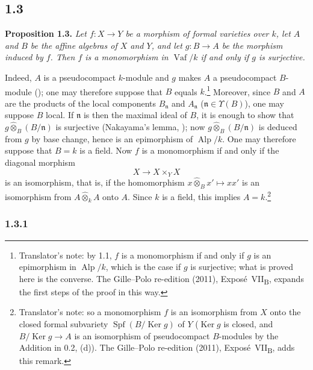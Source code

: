 
\subsection*{1.3}
\label{sga3:VIIB:1.3}

\noindent\textbf{Proposition 1.3.}
\label{sga3:VIIB:1.3.prop}
{\itshape Let \(f:X\to Y\) be a morphism of formal varieties over
\(k\), let \(A\) and \(B\) be the affine algebras of \(X\) and \(Y\),
and let \(g:B\to A\) be the morphism induced by \(f\). Then \(f\) is a
monomorphism in \(\operatorname{Vaf}/k\) if and only if \(g\) is
surjective.}

Indeed, \(A\) is a pseudocompact \(k\)-module and \(g\) makes \(A\) a
pseudocompact \(B\)-module (); one may therefore suppose that
\(B\) equals \(k\).\footnote{Translator's note: by 1.1, \(f\) is a monomorphism if and only if \(g\) is an
epimorphism in \(\operatorname{Alp}/k\), which is the case if \(g\) is surjective; what is proved here is
the converse. The Gille--Polo re-edition (2011), Expos\'e~VII\textsubscript{B}, expands the first steps of
the proof in this way.} Moreover, since \(B\) and \(A\) are the products of
the local components \(B_{\mathfrak n}\) and \(A_{\mathfrak n}\)
(\(\mathfrak n\in\Upsilon(B)\)), one may suppose \(B\) local. If
\(\mathfrak n\) is then the maximal ideal of \(B\), it is enough to show
that \(g\widehat{\otimes}_B(B/\mathfrak n)\) is surjective (Nakayama's
lemma, ); now \(g\widehat{\otimes}_B(B/\mathfrak n)\) is deduced
from \(g\) by base change, hence is an epimorphism of
\(\operatorname{Alp}/k\). One may therefore suppose that \(B=k\) is a
field. Now \(f\) is a monomorphism if and only if the diagonal morphism
\[
  X\longrightarrow X\times_YX
\]
is an isomorphism, that is, if the homomorphism
\(x\widehat{\otimes}_Bx'\mapsto xx'\) is an isomorphism from
\(A\widehat{\otimes}_kA\) onto \(A\). Since \(k\) is a field, this implies
\(A=k\).\footnote{Translator's note: so a monomorphism \(f\) is an isomorphism from \(X\) onto the closed
formal subvariety \(\operatorname{Spf}(B/\operatorname{Ker}g)\) of \(Y\) (\(\operatorname{Ker}g\) is closed,
and \(B/\operatorname{Ker}g\to A\) is an isomorphism of pseudocompact \(B\)-modules by the Addition in 0.2,
(d)). The Gille--Polo re-edition (2011), Expos\'e~VII\textsubscript{B}, adds this remark.}

\subsubsection*{1.3.1}
\label{sga3:VIIB:1.3.1}

